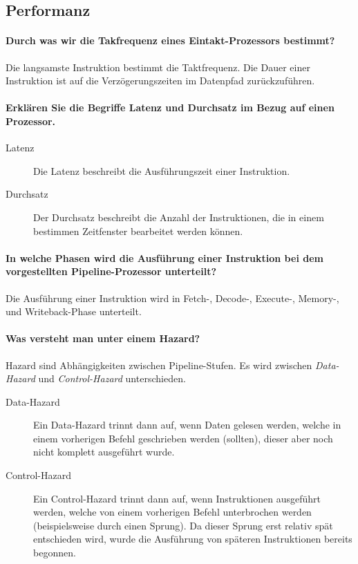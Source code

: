 \subsection{Performanz}
\paragraph{Durch was wir die Takfrequenz eines Eintakt-Prozessors bestimmt?}
Die langsamste Instruktion bestimmt die Taktfrequenz. Die Dauer einer Instruktion ist auf die Verzögerungszeiten im Datenpfad zurückzuführen.

\paragraph{Erklären Sie die Begriffe Latenz und Durchsatz im Bezug auf einen Prozessor.}
\begin{description}
	\item[Latenz] Die Latenz beschreibt die Ausführungszeit einer Instruktion.
	\item[Durchsatz] Der Durchsatz beschreibt die Anzahl der Instruktionen, die in einem bestimmen Zeitfenster bearbeitet werden können.
\end{description}

\paragraph{In welche Phasen wird die Ausführung einer Instruktion bei dem vorgestellten Pipeline-Prozessor unterteilt?}
Die Ausführung einer Instruktion wird in Fetch-, Decode-, Execute-, Memory-, und Writeback-Phase unterteilt.

\paragraph{Was versteht man unter einem Hazard?}
	Hazard sind Abhängigkeiten zwischen Pipeline-Stufen. Es wird zwischen \textit{Data-Hazard} und \textit{Control-Hazard} unterschieden.
	\begin{description}
		\item[Data-Hazard] Ein Data-Hazard trinnt dann auf, wenn Daten gelesen werden, welche in einem vorherigen Befehl geschrieben werden (sollten), dieser aber noch nicht komplett ausgeführt wurde.
		\item[Control-Hazard] Ein Control-Hazard trinnt dann auf, wenn Instruktionen ausgeführt werden, welche von einem vorherigen Befehl unterbrochen werden (beispielsweise durch einen Sprung). Da dieser Sprung erst relativ spät entschieden wird, wurde die Ausführung von späteren Instruktionen bereits begonnen.
	\end{description}


